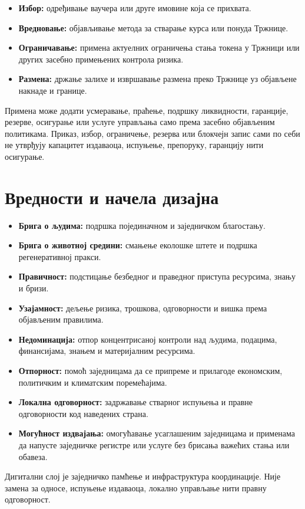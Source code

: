 \documentclass[11pt]{article}
\begin{document}
\begin{itemize}[leftmargin=*]
\item \textbf{Избор:} одређивање ваучера или друге имовине која се прихвата.
\item \textbf{Вредновање:} објављивање метода за стварање курса или понуда Тржнице.
\item \textbf{Ограничавање:} примена актуелних ограничења стања токена у Тржници или других засебно примењених контрола ризика.
\item \textbf{Размена:} држање залихе и извршавање размена преко Тржнице уз објављене накнаде и границе.
\end{itemize}
Примена може додати усмеравање, праћење, подршку ликвидности, гаранције, резерве, осигурање или услуге управљања само према засебно објављеним политикама. Приказ, избор, ограничење, резерва или блокчејн запис сами по себи не утврђују капацитет издаваоца, испуњење, препоруку, гаранцију нити осигурање.

\section*{Вредности и начела дизајна}

\begin{itemize}[leftmargin=*]
\item \textbf{Брига о људима:} подршка појединачном и заједничком благостању.
\item \textbf{Брига о животној средини:} смањење еколошке штете и подршка регенеративној пракси.
\item \textbf{Правичност:} подстицање безбедног и праведног приступа ресурсима, знању и бризи.
\item \textbf{Узајамност:} дељење ризика, трошкова, одговорности и вишка према објављеним правилима.
\item \textbf{Недоминација:} отпор концентрисаној контроли над људима, подацима, финансијама, знањем и материјалним ресурсима.
\item \textbf{Отпорност:} помоћ заједницама да се припреме и прилагоде економским, политичким и климатским поремећајима.
\item \textbf{Локална одговорност:} задржавање стварног испуњења и правне одговорности код наведених страна.
\item \textbf{Могућност издвајања:} омогућавање усаглашеним заједницама и применама да напусте заједничке регистре или услуге без брисања важећих стања или обавеза.
\end{itemize}
Дигитални слој је заједничко памћење и инфраструктура координације. Није замена за односе, испуњење издаваоца, локално управљање нити правну одговорност.
\end{document}
